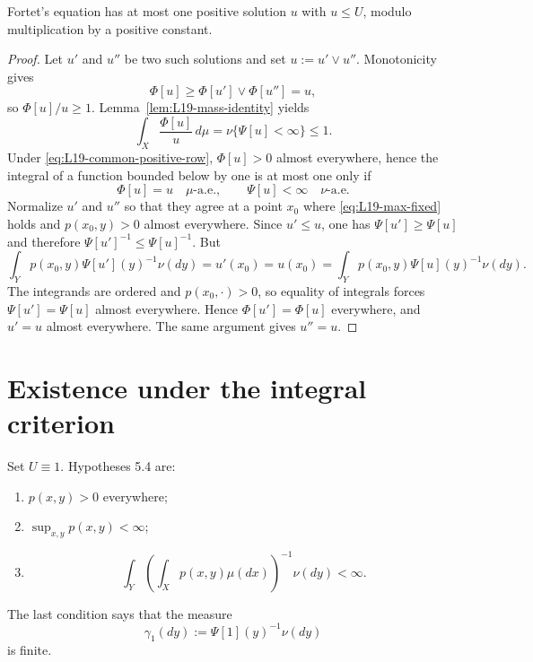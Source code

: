 \begin{proposition}\label{prop:L19-unique}
Fortet's equation has at most one positive solution $u$ with $u\le U$, modulo multiplication by a positive constant.
\end{proposition}
\begin{proof}
Let $u'$ and $u''$ be two such solutions and set $u:=u'\vee u''$.  Monotonicity gives
\[
 \Phi[u]\ge\Phi[u']\vee\Phi[u'']=u,
\]
so $\Phi[u]/u\ge1$.  Lemma~\ref{lem:L19-mass-identity} yields
\[
 \int_X\frac{\Phi[u]}u\,d\mu
 =\nu\{\Psi[u]<\infty\}\le1.
\]
Under \eqref{eq:L19-common-positive-row}, $\Phi[u]>0$ almost everywhere, hence the integral of a function bounded below by one is at most one only if
\begin{equation}\label{eq:L19-max-fixed}
 \Phi[u]=u\quad\mu\text{-a.e.},
 \qquad
 \Psi[u]<\infty\quad\nu\text{-a.e.}
\end{equation}
Normalize $u'$ and $u''$ so that they agree at a point $x_0$ where \eqref{eq:L19-max-fixed} holds and $p(x_0,y)>0$ almost everywhere.  Since $u'\le u$, one has $\Psi[u']\ge\Psi[u]$ and therefore $\Psi[u']^{-1}\le\Psi[u]^{-1}$.  But
\[
 \int_Yp(x_0,y)\Psi[u'](y)^{-1}\nu(dy)
 =u'(x_0)=u(x_0)
 =\int_Yp(x_0,y)\Psi[u](y)^{-1}\nu(dy).
\]
The integrands are ordered and $p(x_0,\cdot)>0$, so equality of integrals forces $\Psi[u']=\Psi[u]$ almost everywhere.  Hence $\Phi[u']=\Phi[u]$ everywhere, and $u'=u$ almost everywhere.  The same argument gives $u''=u$.
\end{proof}

\section{Existence under the integral criterion}
Set $U\equiv1$.  Hypotheses 5.4 are:
\begin{enumerate}[label=(\alph*),leftmargin=2em]
\item $p(x,y)>0$ everywhere;
\item $\sup_{x,y}p(x,y)<\infty$;
\item
\begin{equation}\label{eq:L19-finite-gamma}
 \int_Y\left(\int_Xp(x,y)\mu(dx)\right)^{-1}\nu(dy)<\infty.
\end{equation}
\end{enumerate}
The last condition says that the measure
\[
 \gamma_1(dy):=\Psi[1](y)^{-1}\nu(dy)
\]
is finite.

